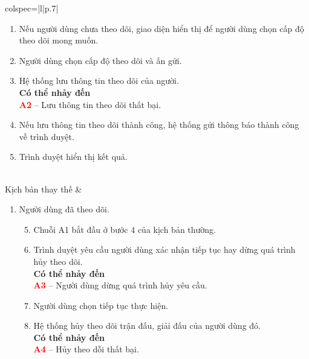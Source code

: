 \begin{longtblr}[caption = {Đặc tả usecase Theo dõi trận đấu, giải đấu},
  label = {tab:usecase5-spec},]{colspec={|l|p{.7\linewidth}|}}
\begin{minipage}{\linewidth}
\begin{enumerate}
            \textbf{Có thể nhảy đến}\\
            \textbf{\textcolor{red}{A1}} -- Người dùng đã theo dõi.
      \item Nếu người dùng chưa theo dõi, giao diện hiển thị để người dùng chọn cấp độ theo dõi mong muốn.
      \item Người dùng chọn cấp độ theo dõi và ấn gửi.
      \item Hệ thống lưu thông tin theo dõi của người.  \\
            \textbf{Có thể nhảy đến}\\
            \textbf{\textcolor{red}{A2}} -- Lưu thông tin theo dõi thất bại.
      \item Nếu lưu thông tin theo dõi thành công, hệ thống gửi thông báo thành công về trình duyệt.
      \item Trình duyệt hiển thị kết quả.
    \end{enumerate}
    \vskip 1pt
  \end{minipage}
  \\\hline
  Kịch bản thay thế    &
  \begin{minipage}{\linewidth}
    \vskip 4pt
    \begin{enumerate}[label={\textbf{\textcolor{red}{A\arabic*}} --}, align=left, itemsep=-5pt]
      \item  Người dùng đã theo dõi.  \\
            \vspace{-1.5em}
            \begin{enumerate}[leftmargin=-5px, align=left, label=\arabic*.]
              \setcounter{enumii}{4}
              \item[]
                    \hspace{-25px} Chuỗi A1 bắt đầu ở bước 4 của kịch bản thường.
              \item Trình duyệt yêu cầu người dùng xác nhận tiếp tục hay dừng quá trình hủy theo dõi.\\
                    \textbf{Có thể nhảy đến}\\
                    \textbf{\textcolor{red}{A3}} -- Người dùng dừng quá trình hủy yêu cầu.
              \item Người dùng chọn tiếp tục thực hiện.
              \item Hệ thống hủy theo dõi trận đấu, giải đấu của người dùng đó.\\
                    \textbf{Có thể nhảy đến}\\
                    \textbf{\textcolor{red}{A4}} -- Hủy theo dỗi thất bại.


\end{enumerate}
\end{enumerate}
\end{minipage}
\end{longtblr}
